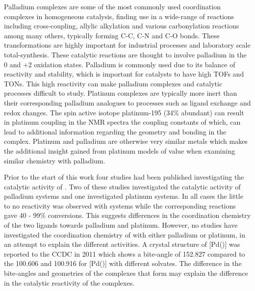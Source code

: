 Palladium complexes are some of the most commonly used coordination complexes in homogeneous catalysis, finding use in a wide-range of reactions including cross-coupling, allylic alkylation and various carbonylation reactions among many others, typically forming C-C, C-N and C-O bonds.\cite{Klingensmith2006}  These transformations are highly important for industrial processes and laboratory scale total-synthesis.  These catalytic reactions are thought to involve palladium in the 0 and +2 oxidation states.  Palladium is commonly used due to its balance of reactivity and stability, which is important for catalysts to have high \glspl{TOF} and \glspl{TON}.  This high reactivity can make palladium complexes and catalytic processes difficult to study. Platinum complexes are typically more inert than their corresponding palladium analogues to processes such as ligand exchange and redox changes.  The spin active isotope platinum-195 (34\% abundant) can result in platinum coupling in the NMR spectra the coupling constants of which, can lead to additional information regarding the geometry and bonding in the complex.  Platinum and palladium are otherwise very similar metals which makes the additional insight gained from platinum models of value when examining similar chemistry with palladium.  

Prior to the start of this work four studies had been published investigating the catalytic activity of \tBuxantphos{}.\cite{Mispelaere2005, Dongol2007, Ohshima2009, Cabello2007}  Two of these studies investigated the catalytic activity of \tBuxantphos{} palladium systems and one investigated platinum systems.  In all cases the little to no reactivity was observed with \tBuxantphos{} systems while the corresponding \Phxantphos{} reactions gave 40 - 99\% conversions.  This suggests differences in the coordination chemistry of the two ligands towards palladium and platinum.  However, no studies have investigated the coordination chemistry of \tBuxantphos{} with either palladium or platinum, in an attempt to explain the different activities.  A crystal structure of [Pd(\tBuxantphos)] was reported to the \gls{CCDC} in 2011 which shows a bite-angle of 152.827\degrees{} compared to the 100.606 and 100.916\degrees{} for [Pd(\Phxantphos)] with different solvates.  The difference in the bite-angles and geometries of the complexes that form may explain the difference in the catalytic reactivity of the complexes.  

